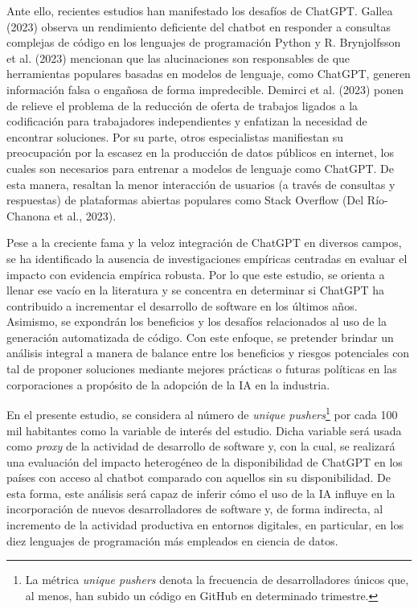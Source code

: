 \documentclass[12pt,a4paper]{article}
\begin{document}
Ante ello, recientes estudios han manifestado los desafíos de ChatGPT. Gallea (2023) observa un rendimiento deficiente del chatbot en responder a consultas complejas de código en los lenguajes de programación Python y R. Brynjolfsson et al. (2023) mencionan que las alucinaciones son responsables de que herramientas populares basadas en modelos de lenguaje, como ChatGPT, generen información falsa o engañosa de forma impredecible. Demirci et al. (2023) ponen de relieve el problema de la reducción de oferta de trabajos ligados a la codificación para trabajadores independientes y enfatizan la necesidad de encontrar soluciones. Por su parte, otros especialistas manifiestan su preocupación por la escasez en la producción de datos públicos en internet, los cuales son necesarios para entrenar a modelos de lenguaje como ChatGPT. De esta manera, resaltan la menor interacción de usuarios (a través de consultas y respuestas) de plataformas abiertas populares como Stack Overflow (Del Río-Chanona et al., 2023).

Pese a la creciente fama y la veloz integración de ChatGPT en diversos campos, se ha identificado la ausencia de investigaciones empíricas centradas en evaluar el impacto con evidencia empírica robusta. Por lo que este estudio, se orienta a llenar ese vacío en la literatura y se concentra en determinar si ChatGPT ha contribuido a incrementar el desarrollo de software en los últimos años. Asimismo, se expondrán los beneficios y los desafíos relacionados al uso de la generación automatizada de código. Con este enfoque, se pretender brindar un análisis integral a manera de balance entre los beneficios y riesgos potenciales con tal de proponer soluciones mediante mejores prácticas o futuras políticas en las corporaciones a propósito de la adopción de la IA en la industria.

En el presente estudio, se considera al número de \textit{unique pushers}\footnote{La métrica \textit{unique pushers} denota la frecuencia de desarrolladores únicos que, al menos, han subido un código en GitHub en determinado trimestre.} por cada 100 mil habitantes como la variable de interés del estudio. Dicha variable será usada como \textit{proxy} de la actividad de desarrollo de software y, con la cual, se realizará una evaluación del impacto heterogéneo de la disponibilidad de ChatGPT en los países con acceso al chatbot comparado con aquellos sin su disponibilidad. De esta forma, este análisis será capaz de inferir cómo el uso de la IA influye en la incorporación de nuevos desarrolladores de software y, de forma indirecta, al incremento de la actividad productiva en entornos digitales, en particular, en los diez lenguajes de programación más empleados en ciencia de datos.
\end{document}
